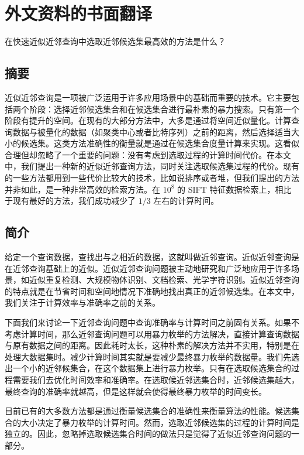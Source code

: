 
\chapter{外文资料的书面翻译}
\label{cha:engorg}
\begin{center}
在快速近似近邻查询中选取近邻候选集最高效的方法是什么？
\end{center}
\section{摘要}
近似近邻查询是一项被广泛运用于许多应用场景中的基础而重要的技术。它主要包括两个阶段：选择近邻候选集合和在候选集合进行最朴素的暴力搜索。只有第一个阶段有提升的空间。在现有的大部分方法中，大多是通过将空间近似量化。计算查询数据与被量化的数据（如聚类中心或者比特序列）之前的距离，然后选择适当大小的候选集。这类方法准确性的衡量就是通过在候选集合度量计算来实现。这看似合理但却忽略了一个重要的问题：没有考虑到选取过程的计算时间代价。在本文中，我们提出一种新的近似近邻查询方法，同时关注选取候选集过程的代价。现有的一些方法都用到一些代价比较大的技术，比如说排序或者堆，但我们提出的方法并非如此，是一种非常高效的检索方法。在 $ 10^8$ 的 SIFT 特征数据检索上，相比于现有最好的方法，我们成功减少了 $1/3$ 左右的计算时间。
\section{简介}
给定一个查询数据，查找出与之相近的数据，这就叫做近邻查询。近似近邻查询是在近邻查询基础上的近似。近似近邻查询问题被主动地研究和广泛地应用于许多场景，如近似重复检测、大规模物体识别、文档检索、光学字符识别。近似近邻查询的特点就是在节省时间和空间地情况下准确地找出真正的近邻候选集。在本文中，我们关注于计算效率与准确率之前的关系。

下面我们来讨论一下近邻查询问题中查询准确率与计算时间之前固有关系。如果不考虑计算时间，那么近邻查询问题可以用暴力枚举的方法解决，直接计算查询数据与原有数据之间的距离。因此耗时太长，这种朴素的解决方法并不实用，特别是在处理大数据集时。减少计算时间其实就是要减少最终暴力枚举的数据量。我们先选出一个小的近邻候集合，在这个数据集上进行暴力枚举。只有在选取候选集合的过程需要我们去优化时间效率和准确率。在选取候近邻选集合时，近邻候选集越大，最终查询的准确率就越高，但是这样就会使得最终暴力枚举的时间变长。

目前已有的大多数方法都是通过衡量候选集合的准确性来衡量算法的性能。候选集合的大小决定了暴力枚举的计算时间。然而，选取近邻候选集的过程的计算时间是独立的。因此，忽略掉选取候选集合时间的做法只是觉得了近似近邻查询问题的一部分。


